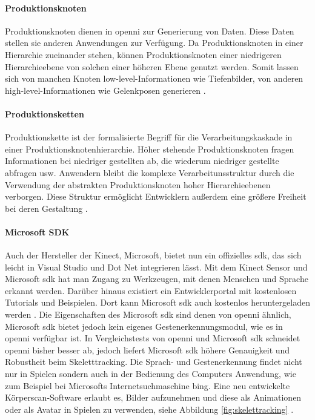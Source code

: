 \paragraph{Produktionsknoten}
Produktionsknoten dienen in \gls{openni} zur Generierung von Daten.
Diese Daten stellen sie anderen Anwendungen zur Verfügung.
Da Produktionsknoten in einer Hierarchie zueinander stehen, können Produktionsknoten einer niedrigeren Hierarchieebene von solchen einer höheren Ebene genutzt werden.
Somit lassen sich von manchen Knoten low-level-Informationen wie Tiefenbilder, von anderen high-level-Informationen wie Gelenkposen generieren \cite{kinect_6}.

\paragraph{Produktionsketten}
Produktionskette ist der formalisierte Begriff für die Verarbeitungskaskade in einer Produktionsknotenhierarchie.
Höher stehende Produktionsknoten fragen Informationen bei niedriger gestellten ab, die wiederum niedriger gestellte abfragen usw.
Anwendern bleibt die komplexe Verarbeitunsstruktur durch die Verwendung der abstrakten Produktionsknoten hoher Hierarchieebenen verborgen.
Diese Struktur ermöglicht Entwicklern außerdem eine größere Freiheit bei deren Gestaltung \cite{kinect_6}.

\paragraph{Microsoft SDK}
Auch der Hersteller der Kinect, Microsoft, bietet nun ein offizielles \gls{sdk}, das sich leicht in Visual Studio und Dot Net integrieren lässt.
Mit dem Kinect Sensor und Microsoft \gls{sdk} hat man Zugang zu Werkzeugen, mit denen Menschen und Sprache erkannt werden.
Darüber hinaus existiert ein Entwicklerportal mit kostenlosen Tutorials und Beispielen.
Dort kann Microsoft \gls{sdk} auch kostenlos heruntergeladen werden \cite{kinect_4}.
Die Eigenschaften des Microsoft \gls{sdk} sind denen von \gls{openni} ähnlich, Microsoft \gls{sdk} bietet jedoch kein eigenes Gestenerkennungsmodul, wie es in \gls{openni} verfügbar ist.
In Vergleichstests von \gls{openni} und Microsoft \gls{sdk} schneidet \gls{openni} bisher besser ab, jedoch liefert Microsoft \gls{sdk} höhere Genauigkeit und Robustheit beim Skeletttracking.
Die Sprach- und Gestenerkennung findet nicht nur in Spielen sondern auch in der Bedienung des Computers Anwendung, wie zum Beispiel bei Microsofts Internetsuchmaschine bing.
Eine neu entwickelte Körperscan-Software erlaubt es, Bilder aufzunehmen und diese als Animationen oder als Avatar in Spielen zu verwenden, siehe Abbildung \ref{fig:skelettracking} \cite{kinect_5}.

